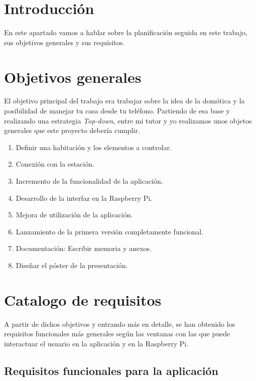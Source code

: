 
\section{Introducción}

En este apartado vamos a hablar sobre la planificación seguida en este trabajo, sus objetivos generales y sus requisitos.

\section{Objetivos generales}

El objetivo principal del trabajo era trabajar sobre la idea de la domótica y la posibilidad de manejar tu casa desde tu teléfono. Partiendo de esa base y realizando una estrategia \textit{Top-down}, entre mi tutor y yo realizamos unos objetos generales que este proyecto debería cumplir.

\begin{enumerate}
	\item Definir una habitación y los elementos a controlar.
	\item Conexión con la estación.
	\item Incremento de la funcionalidad de la aplicación.
	\item Desarrollo de la interfaz en la Raspberry Pi.
	\item Mejora de utilización de la aplicación.
	\item Lanzamiento de la primera versión completamente funcional.
	\item Documentación: Escribir memoria y anexos.
	\item Diseñar el póster de la presentación.
\end{enumerate}

\section{Catalogo de requisitos}

A partir de dichos objetivos y entrando más en detalle, se han obtenido los requisitos funcionales más generales según las ventanas con las que puede interactuar el usuario en la aplicación y en la Raspberry Pi.

\subsection{Requisitos funcionales para la aplicación}

